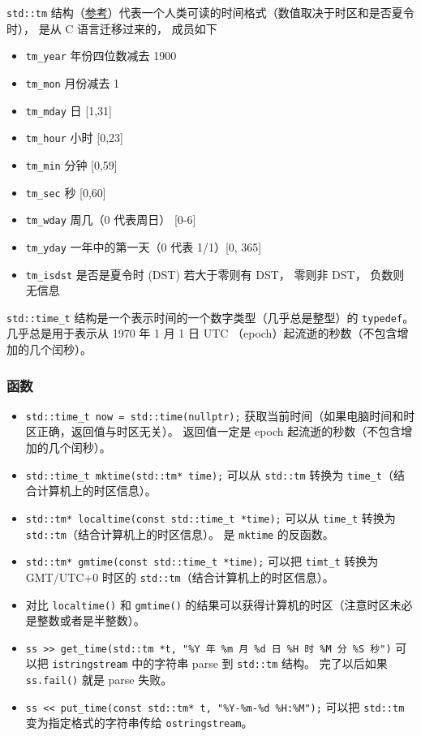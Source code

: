 
\begin{issues}
\issueDraft
\end{issues}


\verb|std::tm| 结构（\href{https://en.cppreference.com/w/cpp/chrono/c/tm}{参考}）代表一个人类可读的时间格式（数值取决于时区和是否夏令时）， 是从 C 语言迁移过来的， 成员如下
\begin{itemize}
\item \verb|tm_year| 年份四位数减去 1900
\item \verb|tm_mon| 月份减去 1
\item \verb|tm_mday| 日 [1,31]
\item \verb|tm_hour| 小时 [0,23]
\item \verb|tm_min| 分钟 [0,59]
\item \verb|tm_sec| 秒 [0,60]
\end{itemize}
\begin{itemize}
\item \verb|tm_wday| 周几（0 代表周日） [0-6]
\item \verb|tm_yday| 一年中的第一天（0 代表 1/1）[0, 365]
\item \verb|tm_isdst| 是否是夏令时 (DST) 若大于零则有 DST， 零则非 DST， 负数则无信息
\end{itemize}

\verb|std::time_t| 结构是一个表示时间的一个数字类型（几乎总是整型）的 \verb|typedef|。 几乎总是用于表示从 1970 年 1 月 1 日 UTC （epoch）起流逝的秒数（不包含增加的几个闰秒）。

\subsubsection{函数}
\begin{itemize}
\item \verb|std::time_t now = std::time(nullptr);| 获取当前时间（如果电脑时间和时区正确，返回值与时区无关）。 返回值一定是 epoch 起流逝的秒数（不包含增加的几个闰秒）。
\item \verb|std::time_t mktime(std::tm* time);| 可以从 \verb|std::tm| 转换为 \verb|time_t|（结合计算机上的时区信息）。
\item \verb|std::tm* localtime(const std::time_t *time);| 可以从 \verb|time_t| 转换为 \verb|std::tm|（结合计算机上的时区信息）。 是 \verb|mktime| 的反函数。
\item \verb|std::tm* gmtime(const std::time_t *time);| 可以把 \verb|timt_t| 转换为 GMT/UTC+0 时区的 \verb|std::tm|（结合计算机上的时区信息）。
\item 对比 \verb|localtime()| 和 \verb|gmtime()| 的结果可以获得计算机的时区（注意时区未必是整数或者是半整数）。
\item \verb|ss >> get_time(std::tm *t, "%Y 年 %m 月 %d 日 %H 时 %M 分 %S 秒")| 可以把 \verb|istringstream| 中的字符串 parse 到 \verb|std::tm| 结构。 完了以后如果 \verb|ss.fail()| 就是 parse 失败。
\item \verb|ss << put_time(const std::tm* t, "%Y-%m-%d %H:%M");| 可以把 \verb|std::tm| 变为指定格式的字符串传给 \verb|ostringstream|。
\end{itemize}
